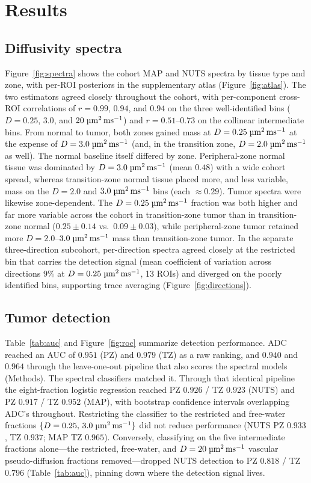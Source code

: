 \section{Results}

\subsection{Diffusivity spectra}

Figure~\ref{fig:spectra} shows the cohort MAP and NUTS spectra by tissue type and zone, with per-ROI posteriors in the supplementary atlas (Figure~\ref{fig:atlas}). The two estimators agreed closely throughout the cohort, with per-component cross-ROI correlations of $r = 0.99$, $0.94$, and $0.94$ on the three well-identified bins ($D = 0.25$, $3.0$, and $20\;\si{\micro\meter\squared\per\milli\second}$) and $r = 0.51$--$0.73$ on the collinear intermediate bins.
From normal to tumor, both zones gained mass at $D = 0.25\;\si{\micro\meter\squared\per\milli\second}$ at the expense of $D = 3.0\;\si{\micro\meter\squared\per\milli\second}$ (and, in the transition zone, $D = 2.0\;\si{\micro\meter\squared\per\milli\second}$ as well).
The normal baseline itself differed by zone. Peripheral-zone normal tissue was dominated by $D = 3.0\;\si{\micro\meter\squared\per\milli\second}$ (mean $0.48$) with a wide cohort spread, whereas transition-zone normal tissue placed more, and less variable, mass on the $D = 2.0$ and $3.0\;\si{\micro\meter\squared\per\milli\second}$ bins (each $\approx 0.29$).
Tumor spectra were likewise zone-dependent. The $D = 0.25\;\si{\micro\meter\squared\per\milli\second}$ fraction was both higher and far more variable across the cohort in transition-zone tumor than in transition-zone normal ($0.25 \pm 0.14$ vs.\ $0.09 \pm 0.03$), while peripheral-zone tumor retained more $D = 2.0$--$3.0\;\si{\micro\meter\squared\per\milli\second}$ mass than transition-zone tumor.
In the separate three-direction subcohort, per-direction spectra agreed closely at the restricted bin that carries the detection signal (mean coefficient of variation across directions $9\%$ at $D = 0.25\;\si{\micro\meter\squared\per\milli\second}$, 13 ROIs) and diverged on the poorly identified bins, supporting trace averaging (Figure~\ref{fig:directions}).

\subsection{Tumor detection}

Table~\ref{tab:auc} and Figure~\ref{fig:roc} summarize detection performance.
ADC reached an AUC of $0.951$ (PZ) and $0.979$ (TZ) as a raw ranking, and $0.940$ and $0.964$ through the leave-one-out pipeline that also scores the spectral models (Methods).
The spectral classifiers matched it. Through that identical pipeline the eight-fraction logistic regression reached PZ $0.926$ / TZ $0.923$ (NUTS) and PZ $0.917$ / TZ $0.952$ (MAP), with bootstrap confidence intervals overlapping ADC's throughout.
Restricting the classifier to the restricted and free-water fractions $\{D = 0.25,\,3.0\;\si{\micro\meter\squared\per\milli\second}\}$ did not reduce performance (NUTS PZ $0.933$, TZ $0.937$; MAP TZ $0.965$). Conversely, classifying on the five intermediate fractions alone---the restricted, free-water, and $D = 20\;\si{\micro\meter\squared\per\milli\second}$ vascular pseudo-diffusion fractions removed---dropped NUTS detection to PZ $0.818$ / TZ $0.796$ (Table~\ref{tab:auc}), pinning down where the detection signal lives.

